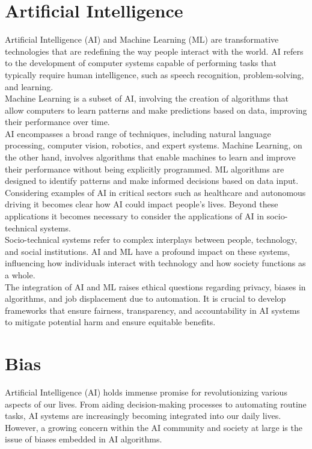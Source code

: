 \documentclass[12pt,a4paper,openright,twoside]{book}
\begin{document}
\section{Artificial Intelligence}
Artificial Intelligence (AI) and Machine Learning (ML) are transformative technologies that are redefining the way people interact with the world. AI refers to the development of computer systems capable of performing tasks that typically require human intelligence, such as speech recognition, problem-solving, and learning. \\
Machine Learning is a subset of AI, involving the creation of algorithms that allow computers to learn patterns and make predictions based on data, improving their performance over time. \\
AI encompasses a broad range of techniques, including natural language processing, computer vision, robotics, and expert systems. Machine Learning, on the other hand, involves algorithms that enable machines to learn and improve their performance without being explicitly programmed. ML algorithms are designed to identify patterns and make informed decisions based on data input. \\
Considering examples of AI in critical sectors such as healthcare and autonomous driving it becomes clear how AI could impact people's lives. Beyond these applications it becomes necessary to consider the applications of AI in socio-technical systems. \\
Socio-technical systems refer to complex interplays between people, technology, and social institutions. AI and ML have a profound impact on these systems, influencing how individuals interact with technology and how society functions as a whole. \\
The integration of AI and ML raises ethical questions regarding privacy, biases in algorithms, and job displacement due to automation. It is crucial to develop frameworks that ensure fairness, transparency, and accountability in AI systems to mitigate potential harm and ensure equitable benefits. \cite{GRUETZEMACHER202210288} \\ 

\section{Bias}
Artificial Intelligence (AI) holds immense promise for revolutionizing various aspects of our lives. From aiding decision-making processes to automating routine tasks, AI systems are increasingly becoming integrated into our daily lives. However, a growing concern within the AI community and society at large is the issue of biases embedded in AI algorithms. \cite{10.1145/3308560.3317590}
\end{document}
